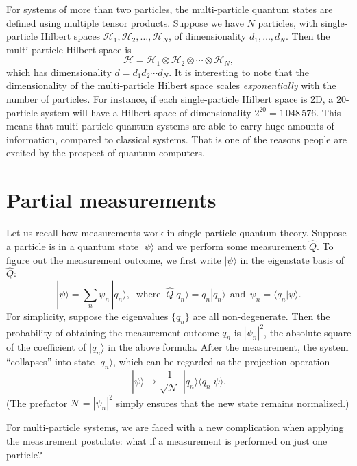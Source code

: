 \documentclass[pra,11pt]{revtex4}
\begin{document}
For systems of more than two particles, the multi-particle quantum
states are defined using multiple tensor products.  Suppose we have
$N$ particles, with single-particle Hilbert spaces $\mathscr{H}_1,
\mathscr{H}_2, \dots, \mathscr{H}_N$, of dimensionality $d_1, \dots,
d_N$.  Then the multi-particle Hilbert space is
$$\mathscr{H} = \mathscr{H}_1 \otimes \mathscr{H}_2 \otimes \cdots
\otimes \mathscr{H}_N,$$
which has dimensionality $d = d_1 d_2\cdots d_N$.  It is interesting
to note that the dimensionality of the multi-particle Hilbert space
scales \textit{exponentially} with the number of particles.  For
instance, if each single-particle Hilbert space is 2D, a
$20$-particle system will have a Hilbert space of dimensionality
$2^{20} =1\,048\,576$.  This means that multi-particle quantum systems
are able to carry huge amounts of information, compared to
classical systems.  That is one of the reasons people are excited by
the prospect of quantum computers.

\section{Partial measurements}
\label{sec:partialmeasurements}

Let us recall how measurements work in single-particle quantum theory.
Suppose a particle is in a quantum state $|\psi\rangle$ and we perform
some measurement $\hat{Q}$.  To figure out the measurement outcome, we
first write $|\psi\rangle$ in the eigenstate basis of $\hat{Q}$:
$$|\psi\rangle = \sum_n \psi_n\, |q_n\rangle, \;\;\mathrm{where}\;\;\hat{Q}|q_n\rangle = q_n |q_n\rangle \;\,\textrm{and}\;\, \psi_n = \langle q_n|\psi\rangle.$$
For simplicity, suppose the eigenvalues $\{q_n\}$ are all
non-degenerate.  Then the probability of obtaining the measurement
outcome $q_n$ is $|\psi_n|^2$, the absolute square of the coefficient
of $|q_n\rangle$ in the above formula.  After the measurement, the
system ``collapses'' into state $|q_n\rangle$, which can be regarded as
the projection operation
$$|\psi\rangle \longrightarrow \frac{1}{\sqrt{\mathcal{N}}}\; |q_n\rangle\langle q_n|\psi\rangle.$$
(The prefactor $\mathcal{N} = |\psi_n|^2$ simply ensures that the new
state remains normalized.)

For multi-particle systems, we are faced with a new complication when
applying the measurement postulate: what if a measurement is performed
on just one particle?
\end{document}
